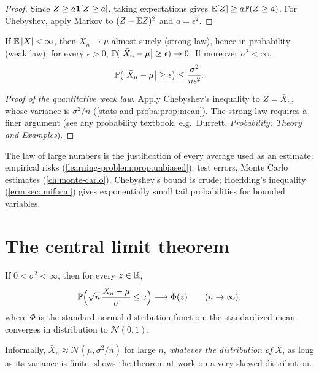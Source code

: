 \begin{notechapter}
\begin{proof}
Since $Z\geq a\mathbf{1}[Z\geq a]$, taking expectations gives
$\mathbb{E}[Z]\geq a\mathbb{P}(Z\geq a)$. For Chebyshev, apply Markov to
$(Z - \mathbb{E} Z)^2$ and $a = \epsilon^2$.
\end{proof}

\begin{theorem}\label{lln-clt-inference:thm:lln}
If $\mathbb{E}\left|X\right|<\infty$, then $\bar X_n\to\mu$ almost surely (strong law), hence in
probability (weak law): for every $\epsilon>0$,
$\mathbb{P}(\left|\bar X_n - \mu\right|\geq\epsilon)\to0$. If moreover $\sigma^2<\infty$,
\[
  \mathbb{P}\bigl(\left|\bar X_n - \mu\right|\geq\epsilon\bigr)\leq\frac{\sigma^2}{n\epsilon^2}.
\]
\end{theorem}

\begin{proof}[Proof of the quantitative weak law]
Apply Chebyshev's inequality to $Z = \bar X_n$, whose variance is $\sigma^2/n$
(\cref{stats-and-proba:prop:mean}). The strong law requires a finer argument
(see any probability textbook, e.g.\ Durrett, \emph{Probability: Theory and
Examples}).
\end{proof}

The law of large numbers is the justification of every average used as an
estimate: empirical risks (\cref{learning-problem:prop:unbiased}), test errors,
Monte Carlo estimates (\cref{ch:monte-carlo}). Chebyshev's bound is crude;
Hoeffding's inequality (\cref{erm:sec:uniform}) gives exponentially small tail
probabilities for bounded variables.

\section{The central limit theorem}\label{lln-clt-inference:sec:clt}

\begin{theorem}\label{lln-clt-inference:thm:clt}
If $0<\sigma^2<\infty$, then for every $z\in\mathbb{R}$,
\[
  \mathbb{P}\Bigl(\sqrt n\,\frac{\bar X_n - \mu}{\sigma}\leq z\Bigr)\longrightarrow\Phi(z)
  \qquad(n\to\infty),
\]
where $\Phi$ is the standard normal distribution function: the standardized
mean converges in distribution to $\mathcal N(0,1)$.
\end{theorem}

Informally, $\bar X_n\approx\mathcal N(\mu,\sigma^2/n)$ for large $n$,
\emph{whatever the distribution of $X$}, as long as its variance is finite.
 shows the theorem at work on a very skewed
distribution.


\end{notechapter}
